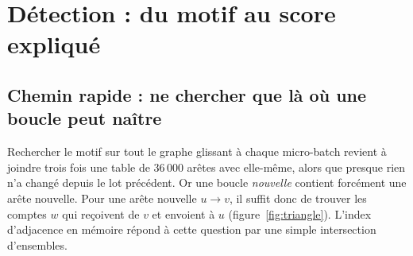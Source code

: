 \chapter{Détection : du motif au score expliqué}
\label{ch:algorithmes}

\section{Chemin rapide : ne chercher que là où une boucle peut naître}
Rechercher le motif  sur
tout le graphe glissant à chaque micro-batch revient à joindre trois fois une
table de 36\,000 arêtes avec elle-même, alors que presque rien n'a changé
depuis le lot précédent. Or une boucle \emph{nouvelle} contient forcément une
arête nouvelle. Pour une arête nouvelle $u \to v$, il suffit donc de trouver
les comptes $w$ qui reçoivent de $v$ et envoient à $u$
(figure~\ref{fig:triangle}). L'index d'adjacence en mémoire répond à cette
question par une simple intersection d'ensembles.


